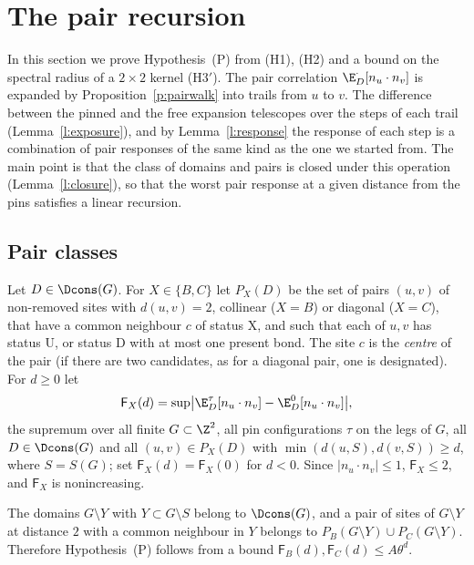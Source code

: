 \section{The pair recursion}\label{s:recursion}

In this section we prove Hypothesis~(P) from (H1), (H2) and a bound on the spectral radius of a $2 \times 2$ kernel (H3$'$). The pair correlation $\E^\cdot_D[n_u \cdot n_v]$ is expanded by Proposition~\ref{p:pairwalk} into trails from $u$ to $v$. The difference between the pinned and the free expansion telescopes over the steps of each trail (Lemma~\ref{l:exposure}), and by Lemma~\ref{l:response} the response of each step is a combination of pair responses of the same kind as the one we started from. The main point is that the class of domains and pairs is closed under this operation (Lemma~\ref{l:closure}), so that the worst pair response at a given distance from the pins satisfies a linear recursion.

\subsection{Pair classes}\label{s:pairclass}

Let $D \in \Dcons(G)$. For $X \in \{B, C\}$ let $P_X(D)$ be the set of pairs $(u, v)$ of non-removed sites with $d(u, v) = 2$, collinear ($X = B$) or diagonal ($X = C$), that have a common neighbour $c$ of status $\mathrm X$, and such that each of $u, v$ has status $\mathrm U$, or status $\mathrm D$ with at most one present bond. The site $c$ is the \emph{centre} of the pair (if there are two candidates, as for a diagonal pair, one is designated). For $d \ge 0$ let
\begin{equation}\label{e:FX}
\mathsf F_X(d) = \sup \bigl| \E^\tau_D[n_u \cdot n_v] - \E^0_D[n_u \cdot n_v] \bigr|,
\end{equation}
the supremum over all finite $G \subset \Z^2$, all pin configurations $\tau$ on the legs of $G$, all $D \in \Dcons(G)$ and all $(u, v) \in P_X(D)$ with $\min(d(u, S), d(v, S)) \ge d$, where $S = S(G)$; set $\mathsf F_X(d) = \mathsf F_X(0)$ for $d < 0$. Since $|n_u \cdot n_v| \le 1$, $\mathsf F_X \le 2$, and $\mathsf F_X$ is nonincreasing.

The domains $G \setminus Y$ with $Y \subset G \setminus S$ belong to $\Dcons(G)$, and a pair of sites of $G \setminus Y$ at distance $2$ with a common neighbour in $Y$ belongs to $P_B(G \setminus Y) \cup P_C(G \setminus Y)$. Therefore Hypothesis~(P) follows from a bound $\mathsf F_B(d), \mathsf F_C(d) \le A \theta^d$.

